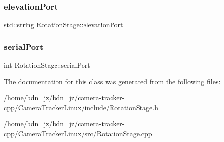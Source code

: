 \subsubsection{\texorpdfstring{elevation\+Port}{elevationPort}}
{\footnotesize\ttfamily std\+::string Rotation\+Stage\+::elevation\+Port\hspace{0.3cm}{\ttfamily [private]}}

\mbox{\label{class_rotation_stage_a3c76fa916da6c1804f62d61e9092ec1c}} 
\subsubsection{\texorpdfstring{serial\+Port}{serialPort}}
{\footnotesize\ttfamily int Rotation\+Stage\+::serial\+Port\hspace{0.3cm}{\ttfamily [private]}}



The documentation for this class was generated from the following files\+:\begin{DoxyCompactItemize}
\item 
/home/bdn\+\_\+jz/bdn\+\_\+jz/camera-\/tracker-\/cpp/\+Camera\+Tracker\+Linux/include/\hyperlink{_rotation_stage_8h}{Rotation\+Stage.\+h}\item 
/home/bdn\+\_\+jz/bdn\+\_\+jz/camera-\/tracker-\/cpp/\+Camera\+Tracker\+Linux/src/\hyperlink{_rotation_stage_8cpp}{Rotation\+Stage.\+cpp}\end{DoxyCompactItemize}
